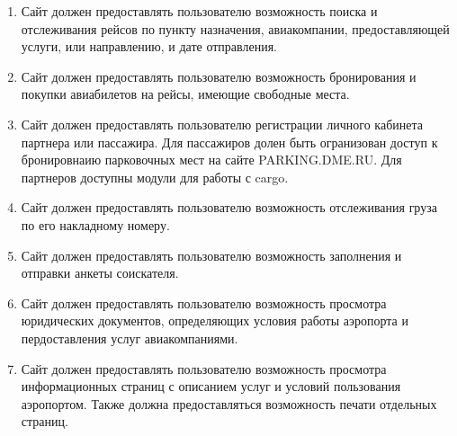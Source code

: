 \begin{enumerate}
      \item Сайт должен предоставлять пользователю возможность поиска
            и отслеживания рейсов по пункту назначения,
            авиакомпании, предоставляющей услуги, или
            направлению, и дате отправления.

      \item Сайт должен предоставлять пользователю возможность бронирования
            и покупки авиабилетов на рейсы, имеющие
            свободные места.

      \item Сайт должен предоставлять пользователю
            регистрации личного кабинета партнера или
            пассажира. Для пассажиров долен быть
            огранизован доступ к бронировнаию парковочных
            мест на сайте PARKING.DME.RU. Для партнеров
            доступны модули для работы с cargo.

      \item Сайт должен предоставлять пользователю возможность
            отслеживания груза по его накладному номеру.

      \item Сайт должен предоставлять пользователю возможность
            заполнения и отправки анкеты соискателя.

      \item Сайт должен предоставлять пользователю возможность
            просмотра юридических документов, определяющих
            условия работы аэропорта и пердоставления
            услуг авиакомпаниями.

      \item Сайт должен предоставлять пользователю возможность просмотра
            информационных страниц с описанием услуг и
            условий пользования аэропортом. Также должна
            предоставляться возможность печати отдельных
            страниц.

\end{enumerate}

